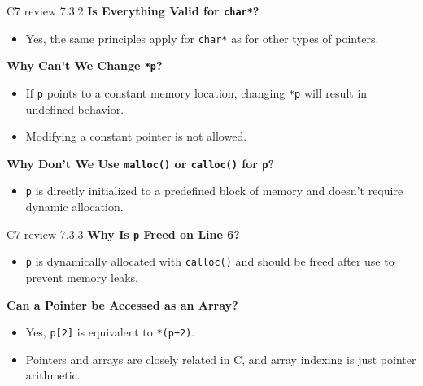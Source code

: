 \documentclass[
	11pt, %
]{beamer}
\begin{document}
\begin{frame}{C7 review 7.3.2}
    \textbf{Is Everything Valid for \texttt{char*}?}
    \begin{itemize}
        \item Yes, the same principles apply for \texttt{char*} as for other types of pointers.
    \end{itemize}
	\textbf{Why Can't We Change \texttt{*p}?}
    \begin{itemize}
        \item If \texttt{p} points to a constant memory location, changing \texttt{*p} will result in undefined behavior.
        \item Modifying a constant pointer is not allowed.
    \end{itemize}
	\textbf{Why Don't We Use \texttt{malloc()} or \texttt{calloc()} for \texttt{p}?}
    \begin{itemize}
        \item \texttt{p} is directly initialized to a predefined block of memory and doesn’t require dynamic allocation.
    \end{itemize}
\end{frame}


\begin{frame}{C7 review 7.3.3}
    \textbf{Why Is \texttt{p} Freed on Line 6?}
    \begin{itemize}
        \item \texttt{p} is dynamically allocated with \texttt{calloc()} and should be freed after use to prevent memory leaks.
    \end{itemize}
	\textbf{Can a Pointer be Accessed as an Array?}
    \begin{itemize}
        \item Yes, \texttt{p[2]} is equivalent to \texttt{*(p+2)}.
        \item Pointers and arrays are closely related in C, and array indexing is just pointer arithmetic.
    \end{itemize}
\end{frame}

\end{document}
